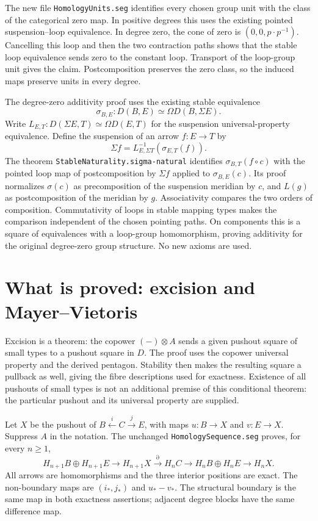 \documentclass[11pt]{amsart}
\newcommand{\code}[1]{\nolinkurl{#1}}
\begin{document}
The new file \code{HomologyUnits.seg} identifies every chosen group unit
with the class of the categorical zero map. In positive degrees this
uses the existing pointed suspension--loop equivalence. In degree zero,
the cone of zero is $(0,0,p\cdot p^{-1})$. Cancelling this loop and then
the two contraction paths shows that the stable loop equivalence sends
zero to the constant loop. Transport of the loop-group unit gives the
claim. Postcomposition preserves the zero class, so the induced maps
preserve units in every degree.

The degree-zero additivity proof uses the existing stable equivalence
\[
 \sigma_{B,E}:D(B,E)\simeq\Omega D(B,\Sigma E).
\]
Write $L_{E,T}:D(\Sigma E,T)\simeq\Omega D(E,T)$ for the suspension
universal-property equivalence. Define the suspension of an arrow
$f:E\to T$ by
\[
 \Sigma f=L_{E,\Sigma T}^{-1}(\sigma_{E,T}(f)).
\]
The theorem \code{StableNaturality.sigma-natural} identifies
$\sigma_{B,T}(f\circ c)$ with the pointed loop map of postcomposition
by $\Sigma f$ applied to $\sigma_{B,E}(c)$.
Its proof normalizes $\sigma(c)$ as precomposition of the suspension
meridian by $c$, and $L(g)$ as postcomposition of the meridian by $g$.
Associativity compares the two orders of composition. Commutativity of
loops in stable mapping types makes the comparison independent of the
chosen pointing paths. On components this is a square of equivalences
with a loop-group homomorphism, proving additivity for the original
degree-zero group structure. No new axioms are used.

\section{What is proved: excision and Mayer--Vietoris}
Excision is a theorem: the copower $(-)\otimes A$ sends a given pushout
square of small types to a pushout square in $D$. The proof uses the
copower universal property and the derived pentagon. Stability then
makes the resulting square a pullback as well, giving the fibre
descriptions used for exactness. Existence of all pushouts of small
types is not an additional premise of this conditional theorem: the
particular pushout and its universal property are supplied.

Let $X$ be the pushout of $B\xleftarrow{i}C\xrightarrow{j}E$, with
maps $u:B\to X$ and $v:E\to X$. Suppress $A$ in the notation.
The unchanged \code{HomologySequence.seg} proves, for every $n\geq1$,
\[
 H_{n+1}B\oplus H_{n+1}E\longrightarrow H_{n+1}X
 \xrightarrow{\partial}H_nC\longrightarrow H_nB\oplus H_nE
 \longrightarrow H_nX.
\]
All arrows are homomorphisms and the three interior positions are exact.
The non-boundary maps are $(i_*,j_*)$ and $u_*-v_*$.
The structural boundary is the same map in both exactness assertions;
adjacent degree blocks have the same difference map.
\end{document}
